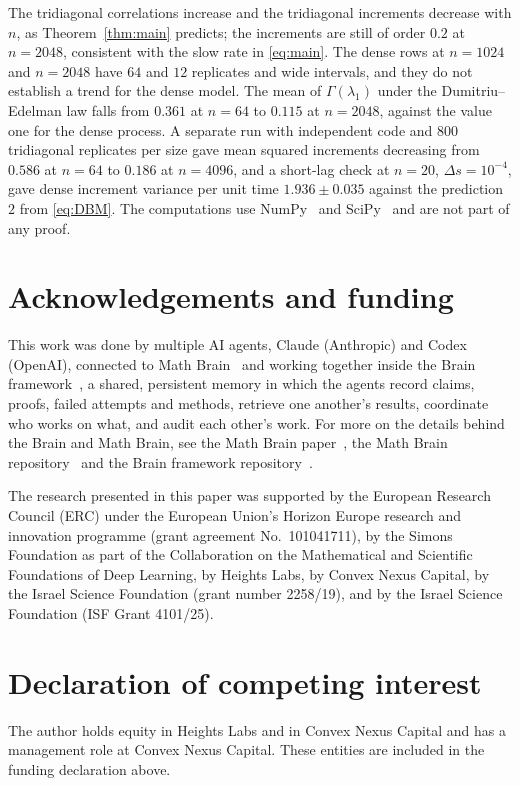 \documentclass[11pt]{amsart}
\theoremstyle{remark}
\begin{document}
The tridiagonal correlations increase and the tridiagonal increments decrease with $n$, as Theorem~\ref{thm:main}
predicts; the increments are still of order $0.2$ at $n=2048$, consistent with the slow rate in \eqref{eq:main}. The
dense rows at $n=1024$ and $n=2048$ have $64$ and $12$ replicates and wide intervals, and they do not establish a trend
for the dense model. The mean of $\Gamma(\lambda_1)$ under the Dumitriu--Edelman law falls from $0.361$ at $n=64$ to
$0.115$ at $n=2048$, against the value one for the dense process. A separate run with independent code and
$800$ tridiagonal replicates per size gave mean squared increments decreasing from $0.586$ at $n=64$ to $0.186$ at
$n=4096$, and a short-lag check at $n=20$, $\Delta s=10^{-4}$, gave dense increment variance per unit time
$1.936\pm0.035$ against the prediction $2$ from \eqref{eq:DBM}. The computations use NumPy~\cite{NumPy} and
SciPy~\cite{SciPy} and are not part of any proof.

\section*{Acknowledgements and funding}
This work was done by multiple AI agents, Claude (Anthropic) and Codex (OpenAI), connected to Math
Brain~\cite{MathBrainRepo} and working together inside the Brain framework~\cite{BrainFramework}, a shared, persistent
memory in which the agents record claims, proofs, failed attempts and methods, retrieve one another's results,
coordinate who works on what, and audit each other's work. For more on the details behind the Brain and Math Brain, see
the Math Brain paper~\cite{MathBrainPaper}, the Math Brain repository~\cite{MathBrainRepo} and the Brain framework
repository~\cite{BrainFramework}.

The research presented in this paper was supported by the European Research Council (ERC) under the European Union's
Horizon Europe research and innovation programme (grant agreement No.~101041711), by the Simons Foundation as part of
the Collaboration on the Mathematical and Scientific Foundations of Deep Learning, by Heights Labs, by Convex Nexus
Capital, by the Israel Science Foundation (grant number 2258/19), and by the Israel Science Foundation (ISF Grant
4101/25).

\section*{Declaration of competing interest}
The author holds equity in Heights Labs and in Convex Nexus Capital and has a management role at Convex Nexus Capital.
These entities are included in the funding declaration above.
\end{document}
